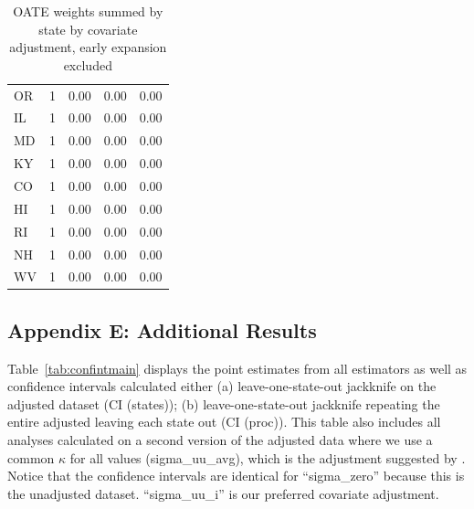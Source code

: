\documentclass[12pt]{article}
\begin{document}
\begin{table}[ht]
\begin{tabular}{lrrrr}
  OR & 1 & 0.00 & 0.00 & 0.00 \\ 
  IL & 1 & 0.00 & 0.00 & 0.00 \\ 
  MD & 1 & 0.00 & 0.00 & 0.00 \\ 
  KY & 1 & 0.00 & 0.00 & 0.00 \\ 
  CO & 1 & 0.00 & 0.00 & 0.00 \\ 
  HI & 1 & 0.00 & 0.00 & 0.00 \\ 
  RI & 1 & 0.00 & 0.00 & 0.00 \\ 
  NH & 1 & 0.00 & 0.00 & 0.00 \\ 
  WV & 1 & 0.00 & 0.00 & 0.00 \\ 
   \bottomrule
\end{tabular}
\caption{OATE weights summed by state by covariate adjustment, early expansion excluded}
\label{tab:oatestateweightsc2}
\end{table}

\subsection{Appendix E: Additional Results}
\label{ssec:allresults}

Table~\ref{tab:confintmain} displays the point estimates from all estimators as well as confidence intervals calculated either (a) leave-one-state-out jackknife on the adjusted dataset (CI (states)); (b) leave-one-state-out jackknife repeating the entire adjusted leaving each state out (CI (proc)). This table also includes all analyses calculated on a second version of the adjusted data where we use a common $\kappa$ for all values (sigma\_uu\_avg), which is the adjustment suggested by \cite{carroll2006measurement}. Notice that the confidence intervals are identical for ``sigma\_zero'' because this is the unadjusted dataset. ``sigma\_uu\_i'' is our preferred covariate adjustment.
\end{document}
